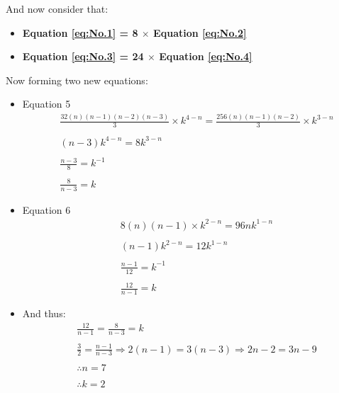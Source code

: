 \documentclass[12pt]{article}
\begin{document}
\newpage
And now consider that:
\begin{itemize}
	\item \textbf{Equation \ref{eq:No.1} = 8 $\times$ Equation \ref{eq:No.2}}
	\item \textbf{Equation \ref{eq:No.3} = 24 $\times$ Equation \ref{eq:No.4}}
\end{itemize}
Now forming two new equations:
\begin{itemize}
	\item Equation 5
	      \begin{equation}
		      \begin{split}
			       & \frac{32(n)(n-1)(n-2)(n-3)}{3} \times k^{4-n} = \frac{256(n)(n-1)(n-2)}{3} \times k^{3-n} \\ \\
			       & (n-3)k^{4-n} = 8k^{3-n}                                                                   \\ \\
			       & \frac{n-3}{8} = k^{-1}                                                                    \\ \\
			       & \frac{8}{n-3} = k
		      \end{split}
	      \end{equation}

	\item Equation 6
	      \begin{equation}
		      \begin{split}
			       & 8(n)(n-1) \times k^{2-n} =  96nk^{1-n} \\ \\
			       & (n-1)k^{2-n} = 12k^{1-n}               \\ \\
			       & \frac{n-1}{12} = k^{-1}                \\ \\
			       & \frac{12}{n-1} = k
		      \end{split}
	      \end{equation}

	\item And thus:
	      \begin{align*}
		       & \frac{12}{n-1} = \frac{8}{n-3} = k                                                    \\ \\
		       & \frac{3}{2} = \frac{n-1}{n-3} \Rightarrow 2(n-1) = 3(n-3) \Rightarrow 2n - 2 = 3n - 9 \\ \\
		       & \therefore n = 7                                                                      \\ \\
		       & \therefore k = 2
	      \end{align*}
\end{itemize}
\end{document}
